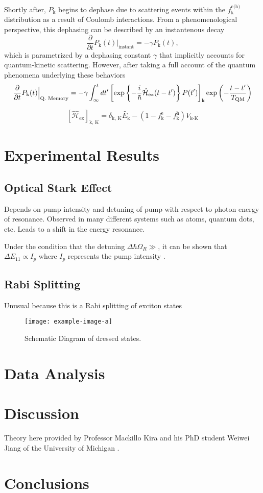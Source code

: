 Shortly after, $P_\text{k}$ begins to dephase due to scattering events within the $f_\text{k}^\text{e(h)}$ distribution as a result of Coulomb interactions. From a phenomenological perspective, this dephasing can be described by an instantenous decay
\begin{equation}
	\dfrac{\partial}{\partial t} P_\text{k}(t) \Big|_\text{instant} = -\gamma P_\text{k}(t),
\end{equation}
which is parametrized by a dephasing constant $\gamma$ that implicitly accounts for quantum-kinetic scattering. However, after taking a full account of the quantum phenomena underlying these behaviors
\begin{equation}
	\dfrac{\partial}{\partial t} P_\text{k}(t) \Big|_\text{Q. Memory} = -\gamma \int^{t}_{\infty} dt' \left[ \exp\left\{ - \frac{\small i}{ \small \hbar} \hat{\mathcal{H}}_\text{ex}(t-t') \right\} P(t') \right]_\text{k} \exp \left(- \frac{t-t'}{T_\text{QM}} \right)
\end{equation}

\begin{equation}
	\left[ \hat{\mathcal{H}}_\text{ex} \right]_\text{k, K}= \delta_\text{k, K} \tilde{E_\text{k}} - (1 - f_\text{k}^\text{e} - f_\text{k}^\text{h}) V_\text{k-K}
\end{equation}


\section{Experimental Results}

\subsection{Optical Stark Effect}

Depends on pump intensity and detuning of pump with respect to photon energy of resonance. Observed in many different systems such as atoms, quantum dots, etc. Leads to a shift in the energy resonance.


Under the condition that the detuning $\Delta \hbar \Omega_R\gg $, it can be shown that $\Delta E_{11} \propto I_p$ where $I_p$ represents the pump intensity \cite{mack}.
\subsection{Rabi Splitting}

Unusual because this is a Rabi splitting of exciton states

\begin{figure}[H]
	\centering
	\texttt{[image: example-image-a]}
	\caption{Schematic Diagram of dressed states. }
\end{figure}

\section{Data Analysis}

\section{Discussion}

Theory here provided by Professor Mackillo Kira and his PhD student Weiwei Jiang of the University of Michigan \cite{mack2019}.



\section{Conclusions}
